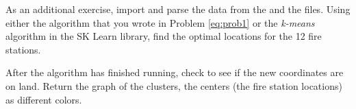 As an additional exercise, import and parse the data from the  and the  files.
Using either the algorithm that you wrote in Problem \ref{eq:prob1} or the \emph{k-means} algorithm in the SK Learn library, find the optimal locations for the 12 fire stations.

After the algorithm has finished running, check to see if the new coordinates are on land.
Return the graph of the clusters, the centers (the fire station locations) as different colors.
